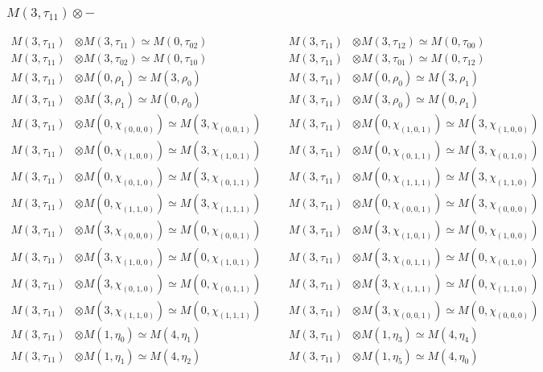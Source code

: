 \subsubsection{$ M(3,\tau_{11})\otimes -$}
\begin{align*}
M(3,\tau_{11}) &\otimes M(3,\tau_{11}) \simeq M(0,\tau_{02}) &&& M(3,\tau_{11}) &\otimes M(3,\tau_{12}) \simeq M(0,\tau_{00})\\
M(3,\tau_{11}) &\otimes M(3,\tau_{02}) \simeq M(0,\tau_{10}) &&& M(3,\tau_{11}) &\otimes M(3,\tau_{01}) \simeq M(0,\tau_{12})\\
M(3,\tau_{11}) &\otimes M(0,\rho_{1}) \simeq M(3,\rho_{0}) &&& M(3,\tau_{11}) &\otimes M(0,\rho_{0}) \simeq M(3,\rho_{1})\\
M(3,\tau_{11}) &\otimes M(3,\rho_{1}) \simeq M(0,\rho_{0}) &&& M(3,\tau_{11}) &\otimes M(3,\rho_{0}) \simeq M(0,\rho_{1})\\
M(3,\tau_{11}) &\otimes M(0,\chi_{(0,0,0)}) \simeq M(3,\chi_{(0,0,1)}) &&& M(3,\tau_{11}) &\otimes M(0,\chi_{(1,0,1)}) \simeq M(3,\chi_{(1,0,0)})\\
M(3,\tau_{11}) &\otimes M(0,\chi_{(1,0,0)}) \simeq M(3,\chi_{(1,0,1)}) &&& M(3,\tau_{11}) &\otimes M(0,\chi_{(0,1,1)}) \simeq M(3,\chi_{(0,1,0)})\\
M(3,\tau_{11}) &\otimes M(0,\chi_{(0,1,0)}) \simeq M(3,\chi_{(0,1,1)}) &&& M(3,\tau_{11}) &\otimes M(0,\chi_{(1,1,1)}) \simeq M(3,\chi_{(1,1,0)})\\
M(3,\tau_{11}) &\otimes M(0,\chi_{(1,1,0)}) \simeq M(3,\chi_{(1,1,1)}) &&& M(3,\tau_{11}) &\otimes M(0,\chi_{(0,0,1)}) \simeq M(3,\chi_{(0,0,0)})\\
M(3,\tau_{11}) &\otimes M(3,\chi_{(0,0,0)}) \simeq M(0,\chi_{(0,0,1)}) &&& M(3,\tau_{11}) &\otimes M(3,\chi_{(1,0,1)}) \simeq M(0,\chi_{(1,0,0)})\\
M(3,\tau_{11}) &\otimes M(3,\chi_{(1,0,0)}) \simeq M(0,\chi_{(1,0,1)}) &&& M(3,\tau_{11}) &\otimes M(3,\chi_{(0,1,1)}) \simeq M(0,\chi_{(0,1,0)})\\
M(3,\tau_{11}) &\otimes M(3,\chi_{(0,1,0)}) \simeq M(0,\chi_{(0,1,1)}) &&& M(3,\tau_{11}) &\otimes M(3,\chi_{(1,1,1)}) \simeq M(0,\chi_{(1,1,0)})\\
M(3,\tau_{11}) &\otimes M(3,\chi_{(1,1,0)}) \simeq M(0,\chi_{(1,1,1)}) &&& M(3,\tau_{11}) &\otimes M(3,\chi_{(0,0,1)}) \simeq M(0,\chi_{(0,0,0)})\\
M(3,\tau_{11}) &\otimes M(1,\eta_{0}) \simeq M(4,\eta_{1}) &&& M(3,\tau_{11}) &\otimes M(1,\eta_{3}) \simeq M(4,\eta_{4})\\
M(3,\tau_{11}) &\otimes M(1,\eta_{1}) \simeq M(4,\eta_{2}) &&& M(3,\tau_{11}) &\otimes M(1,\eta_{5}) \simeq M(4,\eta_{0})\\

\end{align*}
